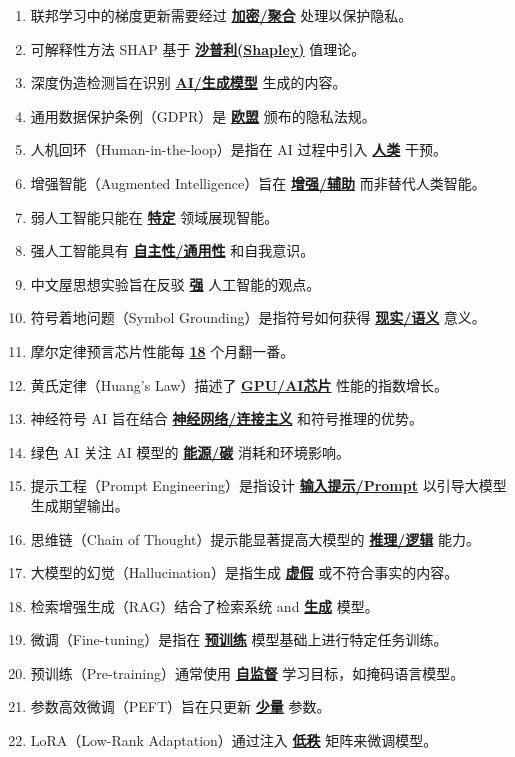 \documentclass[12pt,a4paper,openany]{ctexbook}
\begin{document}
\begin{enumerate}[resume,leftmargin=2em,itemsep=1pt]
\item 联邦学习中的梯度更新需要经过 \underline{\textbf{加密/聚合}} 处理以保护隐私。
\item 可解释性方法 SHAP 基于 \underline{\textbf{沙普利(Shapley)}} 值理论。
\item 深度伪造检测旨在识别 \underline{\textbf{AI/生成模型}} 生成的内容。
\item 通用数据保护条例（GDPR）是 \underline{\textbf{欧盟}} 颁布的隐私法规。
\item 人机回环（Human-in-the-loop）是指在 AI 过程中引入 \underline{\textbf{人类}} 干预。
\item 增强智能（Augmented Intelligence）旨在 \underline{\textbf{增强/辅助}} 而非替代人类智能。
\item 弱人工智能只能在 \underline{\textbf{特定}} 领域展现智能。
\item 强人工智能具有 \underline{\textbf{自主性/通用性}} 和自我意识。
\item 中文屋思想实验旨在反驳 \underline{\textbf{强}} 人工智能的观点。
\item 符号着地问题（Symbol Grounding）是指符号如何获得 \underline{\textbf{现实/语义}} 意义。
\item 摩尔定律预言芯片性能每 \underline{\textbf{18}} 个月翻一番。
\item 黄氏定律（Huang's Law）描述了 \underline{\textbf{GPU/AI芯片}} 性能的指数增长。
\item 神经符号 AI 旨在结合 \underline{\textbf{神经网络/连接主义}} 和符号推理的优势。
\item 绿色 AI 关注 AI 模型的 \underline{\textbf{能源/碳}} 消耗和环境影响。
\item 提示工程（Prompt Engineering）是指设计 \underline{\textbf{输入提示/Prompt}} 以引导大模型生成期望输出。
\item 思维链（Chain of Thought）提示能显著提高大模型的 \underline{\textbf{推理/逻辑}} 能力。
\item 大模型的幻觉（Hallucination）是指生成 \underline{\textbf{虚假}} 或不符合事实的内容。
\item 检索增强生成（RAG）结合了检索系统 and \underline{\textbf{生成}} 模型。
\item 微调（Fine-tuning）是指在 \underline{\textbf{预训练}} 模型基础上进行特定任务训练。
\item 预训练（Pre-training）通常使用 \underline{\textbf{自监督}} 学习目标，如掩码语言模型。
\item 参数高效微调（PEFT）旨在只更新 \underline{\textbf{少量}} 参数。
\item LoRA（Low-Rank Adaptation）通过注入 \underline{\textbf{低秩}} 矩阵来微调模型。

\end{enumerate}
\end{document}
